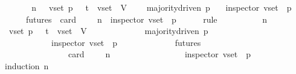 \begin{isabellebody}
%
\isadelimproof
%
\endisadelimproof
%
\isatagproof
{}\isamarkupfalse%
\ {\isacharminus}\ \isanewline
\ \ \isamarkupfalse%
\ {\isachardoublequoteopen}{\isasymforall}\ n{\isachardot}\ {\isasymforall}\ {\isasymsigma}\ v{\isacharunderscore}set\ p{\isachardot}\ {\isasymsigma}\ {\isasymin}\ {\isasymSigma}t\ {\isasymand}\ v{\isacharunderscore}set\ {\isasymsubseteq}\ V\ \isanewline
\ \ {\isasymlongrightarrow}\ majority{\isacharunderscore}driven\ p\isanewline
\ \ {\isasymlongrightarrow}\ inspector\ {\isacharparenleft}v{\isacharunderscore}set{\isacharcomma}\ {\isasymsigma}{\isacharcomma}\ p{\isacharparenright}\ \isanewline
\ \ {\isasymlongrightarrow}\ {\isacharparenleft}{\isasymforall}\ {\isasymsigma}{\isacharprime}\ {\isasymin}\ futures\ {\isasymsigma}{\isachardot}\ card\ {\isacharparenleft}{\isasymsigma}{\isacharprime}\ {\isacharminus}\ {\isasymsigma}{\isacharparenright}\ {\isacharequal}\ n\ {\isasymlongrightarrow}\ inspector\ {\isacharparenleft}v{\isacharunderscore}set{\isacharcomma}\ {\isasymsigma}{\isacharprime}{\isacharcomma}\ p{\isacharparenright}{\isacharparenright}{\isachardoublequoteclose}\isanewline
\ \ \ \ \isamarkupfalse%
\ {\isacharparenleft}rule{\isacharparenright}\isanewline
\ \ \isamarkupfalse%
\ {\isacharminus}\isanewline
\ \ \ \ \isamarkupfalse%
\ n\isanewline
\ \ \ \ \isamarkupfalse%
\ {\isachardoublequoteopen}{\isasymforall}{\isasymsigma}\ v{\isacharunderscore}set\ p{\isachardot}\ {\isasymsigma}\ {\isasymin}\ {\isasymSigma}t\ {\isasymand}\ v{\isacharunderscore}set\ {\isasymsubseteq}\ V\ {\isasymlongrightarrow}\isanewline
\ \ \ \ \ \ \ \ \ \ \ \ majority{\isacharunderscore}driven\ p\ {\isasymlongrightarrow}\isanewline
\ \ \ \ \ \ \ \ \ \ \ \ inspector\ {\isacharparenleft}v{\isacharunderscore}set{\isacharcomma}\ {\isasymsigma}{\isacharcomma}\ p{\isacharparenright}\ {\isasymlongrightarrow}\isanewline
\ \ \ \ \ \ \ \ \ \ \ \ {\isacharparenleft}{\isasymforall}{\isasymsigma}{\isacharprime}{\isasymin}futures\ {\isasymsigma}{\isachardot}\isanewline
\ \ \ \ \ \ \ \ \ \ \ \ \ \ \ \ card\ {\isacharparenleft}{\isasymsigma}{\isacharprime}\ {\isacharminus}\ {\isasymsigma}{\isacharparenright}\ {\isacharequal}\ n\ {\isasymlongrightarrow}\isanewline
\ \ \ \ \ \ \ \ \ \ \ \ \ \ \ \ inspector\ {\isacharparenleft}v{\isacharunderscore}set{\isacharcomma}\ {\isasymsigma}{\isacharprime}{\isacharcomma}\ p{\isacharparenright}{\isacharparenright}{\isachardoublequoteclose}\isanewline
\ \ \ \ \ \ \isamarkupfalse%
\ {\isacharparenleft}induction\ n{\isacharparenright}\isanewline

\end{isabellebody}
